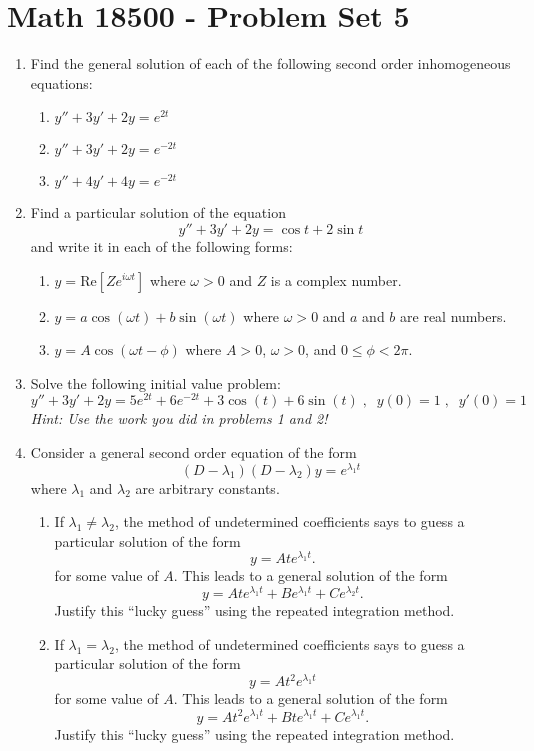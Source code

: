 \documentclass[10pt,psamsfonts,reqno,oneside,letterpaper]{amsart}
\begin{document}
	
	
	\section*{Math 18500 - Problem Set 5}
	\begin{enumerate}[I]

\item Find the general solution of each of the following second order inhomogeneous equations:
\begin{enumerate}
	\item  $y'' + 3y' + 2y = e^{2t}$
	\item  $y'' + 3y' + 2y = e^{-2t}$
	\item  $y'' + 4y' + 4y = e^{-2t} $
\end{enumerate}

\item  Find a particular solution of the equation
\[ y'' + 3y' + 2y = \cos t + 2\sin t \]
and write it in each of the following forms:
\begin{enumerate}
	\item  $y = \mathrm{Re}\left[ Z e^{i\omega t} \right] $ where $\omega>0$ and $Z$ is a complex number.
	\item  $y = a \cos(\omega t) + b \sin(\omega t)$ where $\omega>0$ and $a$ and $b$ are real numbers.
	\item  $y = A \cos(\omega  t - \phi)$ where $A>0$, $\omega>0$, and $0 \leq \phi < 2\pi$.
\end{enumerate}

\item  Solve the following initial value problem:
\[ y'' + 3y' + 2y =  5e^{2t} + 6e^{-2t} + 3\cos(t) + 6\sin(t)  \; , \; \; y(0) = 1 \;, \; \; y'(0) = 1 \]
\textit{Hint: Use the work you did in problems 1 and 2!}

\item  Consider a general second order equation of the form
\[ (D-\lambda_1)(D-\lambda_2) y = e^{\lambda_1 t} \]
where $\lambda_1$ and $\lambda_2$ are arbitrary constants.
\begin{enumerate}
	\item  If $\lambda_1 \neq \lambda_2$, the method of undetermined coefficients says to guess a particular solution of the form 
	\[ y = At e^{\lambda_1 t}. \]
	for some value of $A$.  This leads to a general solution of the form 
	\[ y = A t e^{\lambda_1 t} + B e^{\lambda_1 t} + Ce^{\lambda_2 t}. \]
	Justify this ``lucky guess'' using the repeated integration method.
	\item  If $\lambda_1 = \lambda_2$, the method of undetermined coefficients says to guess a particular solution of the form 
	\[ y = At^2 e^{\lambda_1 t} \]
	for some value of $A$.  This leads to a general solution of the form
	\[ y = At^2 e^{\lambda_1 t}+ B te^{\lambda_1 t} + Ce^{\lambda_1 t}. \]
	Justify this ``lucky guess'' using the repeated integration method.
\end{enumerate}


\end{enumerate}
\end{document}
